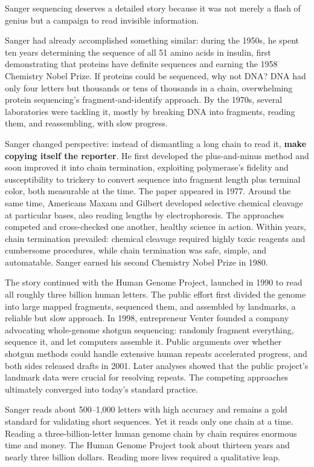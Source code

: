 \begin{zhengju}
Sanger sequencing deserves a detailed story because it was not merely a flash of genius but a campaign to read invisible information.

Sanger had already accomplished something similar: during the 1950s, he spent ten years determining the sequence of all 51 amino acids in insulin, first demonstrating that proteins have definite sequences and earning the 1958 Chemistry Nobel Prize. If proteins could be sequenced, why not DNA? DNA had only four letters but thousands or tens of thousands in a chain, overwhelming protein sequencing's fragment-and-identify approach. By the 1970s, several laboratories were tackling it, mostly by breaking DNA into fragments, reading them, and reassembling, with slow progress.

Sanger changed perspective: instead of dismantling a long chain to read it, \textbf{make copying itself the reporter}. He first developed the plus-and-minus method and soon improved it into chain termination, exploiting polymerase's fidelity and susceptibility to trickery to convert sequence into fragment length plus terminal color, both measurable at the time. The paper appeared in 1977. Around the same time, Americans Maxam and Gilbert developed selective chemical cleavage at particular bases, also reading lengths by electrophoresis. The approaches competed and cross-checked one another, healthy science in action. Within years, chain termination prevailed: chemical cleavage required highly toxic reagents and cumbersome procedures, while chain termination was safe, simple, and automatable. Sanger earned his second Chemistry Nobel Prize in 1980.

The story continued with the Human Genome Project, launched in 1990 to read all roughly three billion human letters. The public effort first divided the genome into large mapped fragments, sequenced them, and assembled by landmarks, a reliable but slow approach. In 1998, entrepreneur Venter founded a company advocating whole-genome shotgun sequencing: randomly fragment everything, sequence it, and let computers assemble it. Public arguments over whether shotgun methods could handle extensive human repeats accelerated progress, and both sides released drafts in 2001. Later analyses showed that the public project's landmark data were crucial for resolving repeats. The competing approaches ultimately converged into today's standard practice.
\end{zhengju}

Sanger reads about 500--1,000 letters with high accuracy and remains a gold standard for validating short sequences. Yet it reads only one chain at a time. Reading a three-billion-letter human genome chain by chain requires enormous time and money. The Human Genome Project took about thirteen years and nearly three billion dollars. Reading more lives required a qualitative leap.

